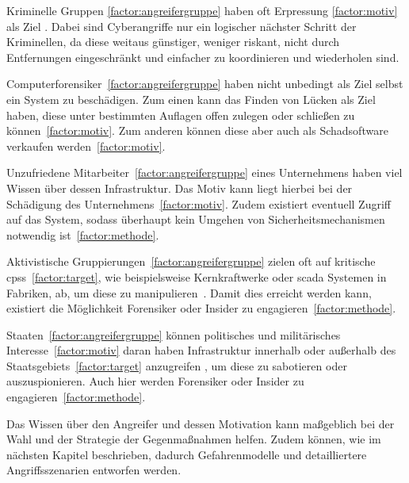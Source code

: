 \documentclass[final,bibliography=totocnumbered]{include/sikseminar}
\newcommand{\cps}{\glspl{cps}\xspace}
\begin{document}
Kriminelle Gruppen \ref{factor:angreifergruppe} haben oft Erpressung \ref{factor:motiv} als Ziel \cite{WYX+10}.
Dabei sind Cyberangriffe nur ein logischer nächster Schritt der Kriminellen, da diese weitaus günstiger, weniger riskant, nicht durch Entfernungen eingeschränkt und einfacher zu koordinieren und wiederholen sind. \cite{CAS+09}

Computerforensiker~\ref{factor:angreifergruppe} haben nicht unbedingt als Ziel selbst ein System zu beschädigen.
Zum einen kann das Finden von Lücken als Ziel haben, diese unter bestimmten Auflagen offen zulegen oder schließen zu können~\ref{factor:motiv}. 
Zum anderen können diese aber auch als Schadsoftware verkaufen werden~\ref{factor:motiv}. 

Unzufriedene Mitarbeiter~\ref{factor:angreifergruppe} eines Unternehmens haben viel Wissen über dessen Infrastruktur.
Das Motiv kann liegt hierbei bei der Schädigung des Unternehmens~\ref{factor:motiv}.
Zudem existiert eventuell Zugriff auf das System, sodass überhaupt kein Umgehen von Sicherheitsmechanismen notwendig ist~\ref{factor:methode}.~\cite{CAS+09,WYX+10}

Aktivistische Gruppierungen~\ref{factor:angreifergruppe} zielen oft auf kritische \cps~\ref{factor:target}, wie beispielsweise Kernkraftwerke oder \gls{scada} Systemen in Fabriken, ab, um diese zu manipulieren~\cite{CAS+09,HLL+17}. 
Damit dies erreicht werden kann, existiert die Möglichkeit Forensiker oder Insider zu engagieren~\ref{factor:methode}.~\cite{WYX+10}

Staaten~\ref{factor:angreifergruppe} können politisches und militärisches Interesse~\ref{factor:motiv} daran haben Infrastruktur innerhalb oder außerhalb des Staatsgebiets~\ref{factor:target} anzugreifen \cite{CAS+09}, um diese zu sabotieren oder auszuspionieren.
Auch hier werden Forensiker oder Insider zu engagieren~\ref{factor:methode}.

Das Wissen über den Angreifer und dessen Motivation kann maßgeblich bei der Wahl und der Strategie der Gegenmaßnahmen helfen.
Zudem können, wie im nächsten Kapitel beschrieben, dadurch Gefahrenmodelle und detailliertere Angriffsszenarien entworfen werden.
\end{document}

